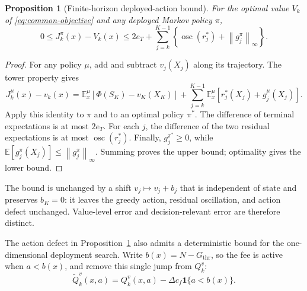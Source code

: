 \documentclass[preprint,11pt]{elsarticle}
\newcommand{\E}{\mathbb{E}}
\newcommand{\osc}{\operatorname{osc}}
\newcommand{\norm}[1]{\left\lVert #1\right\rVert}
\theoremstyle{plain}
\newtheorem{proposition}{Proposition}
\theoremstyle{remark}
\begin{document}
\begin{proposition}[Finite-horizon deployed-action bound]
\label{prop:deployed-bound}
For the optimal value $V_k$ of \eqref{eq:common-objective} and any deployed
Markov policy $\pi$,
\begin{equation}
 0\leq J_k^\pi(x)-V_k(x)
 \leq 2e_T+\sum_{j=k}^{K-1}
 \left\{\osc(r_j^*)+\norm{g_j^\pi}_\infty\right\}.
 \label{eq:deployed-bound}
\end{equation}
\end{proposition}

\begin{proof}
For any policy $\mu$, add and subtract $v_j(X_j)$ along its trajectory. The
tower property gives
\begin{equation}
 J_k^\mu(x)-v_k(x)=
 \E_x^\mu[\Phi(S_K)-v_K(X_K)]
 +\sum_{j=k}^{K-1}\E_x^\mu[r_j^*(X_j)+g_j^\mu(X_j)].
\end{equation}
Apply this identity to $\pi$ and to an optimal policy $\pi^*$. The difference
of terminal expectations is at most $2e_T$. For each $j$, the difference of
the two residual expectations is at most $\osc(r_j^*)$. Finally,
$g_j^{\pi^*}\geq0$, while
$\E[g_j^\pi(X_j)]\leq\norm{g_j^\pi}_\infty$. Summing proves the upper bound;
optimality gives the lower bound.
\end{proof}

\begin{samepage}
The bound is unchanged by a shift $v_j\mapsto v_j+b_j$ that is independent
of state and preserves $b_K=0$: it leaves the greedy action, residual
oscillation, and action defect unchanged. Value-level error and
decision-relevant error are therefore distinct.
\end{samepage}

The action defect in Proposition~\ref{prop:deployed-bound} also admits a
deterministic bound for the one-dimensional deployment search. Write
$b(x)=N-G_{\mathrm{thr}}$, so the fee is active when $a<b(x)$, and remove this
single jump from $Q_k^v$:
\begin{equation}
 \widetilde Q_k^v(x,a)=Q_k^v(x,a)
 -\Delta c_f\mathbf 1\{a<b(x)\}.
\end{equation}
\end{document}
